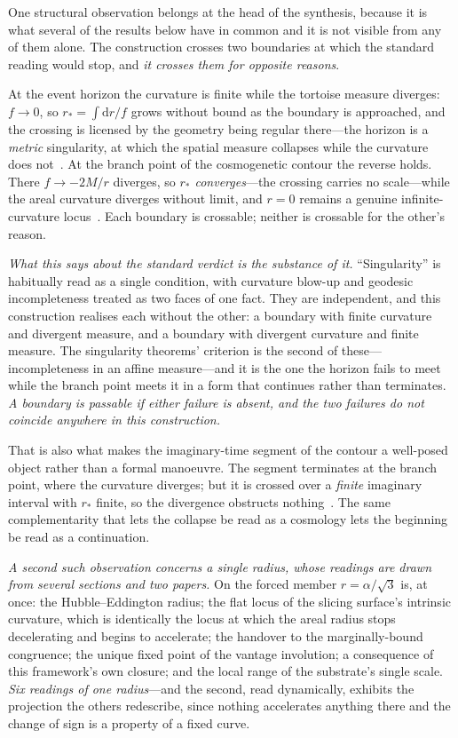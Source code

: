 \documentclass[11pt,a4paper]{article}
\theoremstyle{plain}
\theoremstyle{definition}
\theoremstyle{remark}
\newcommand{\dd}{\mathrm{d}}
\begin{document}
One structural observation belongs at the head of the synthesis, because it is what several of the results
below have in common and it is not visible from any of them alone. The construction crosses two boundaries at
which the standard reading would stop, and \emph{it crosses them for opposite reasons}.

At the event horizon the curvature is finite while the tortoise measure diverges: $f\to0$, so
$r_{*}=\int\dd r/f$ grows without bound as the boundary is approached, and the crossing is licensed by the
geometry being regular there---the horizon is a \emph{metric} singularity, at which the spatial measure
collapses while the curvature does not~\cite{JanzenBHcausality}. At the branch point of the cosmogenetic
contour the reverse holds. There $f\to-2M/r$ diverges, so \emph{$r_{*}$ converges}---the crossing carries no
scale---while the areal curvature diverges without limit, and $r=0$ remains a genuine infinite-curvature
locus~\cite{JanzenCircle}. Each boundary is crossable; neither is crossable for the other's reason.

\emph{What this says about the standard verdict is the substance of it.} ``Singularity'' is habitually read as
a single condition, with curvature blow-up and geodesic incompleteness treated as two faces of one fact. They
are independent, and this construction realises each without the other: a boundary with finite curvature and
divergent measure, and a boundary with divergent curvature and finite measure. The singularity theorems'
criterion is the second of these---incompleteness in an affine measure---and it is the one the horizon fails to
meet while the branch point meets it in a form that continues rather than terminates. \emph{A boundary is
passable if either failure is absent, and the two failures do not coincide anywhere in this construction.}

That is also what makes the imaginary-time segment of the contour a well-posed object rather than a formal
manoeuvre. The segment terminates at the branch point, where the curvature diverges; but it is crossed over a
\emph{finite} imaginary interval with $r_{*}$ finite, so the divergence obstructs
nothing~\cite{JanzenCanonicalTime}. The same complementarity that lets the collapse be read as a cosmology lets
the beginning be read as a continuation.

\emph{A second such observation concerns a single radius, whose readings are drawn from several sections and
two papers.} On the forced member $r=\alpha/\sqrt3$ is, at once: the Hubble--Eddington radius; the
flat locus of the slicing surface's intrinsic curvature, which is identically the locus at which the areal
radius stops decelerating and begins to accelerate; the handover to the marginally-bound congruence; the
unique fixed point of the vantage involution; a consequence of this framework's own closure; and the local range
of the substrate's single scale. \emph{Six readings of one radius}---and the second, read dynamically, exhibits
the projection the others redescribe, since nothing accelerates anything there and the change of sign is a property of a fixed curve.
\end{document}
